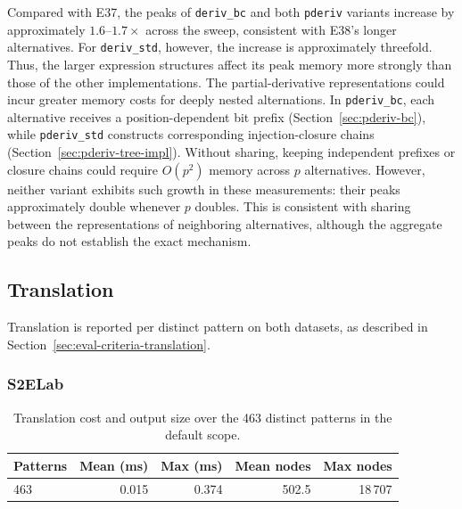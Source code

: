 Compared with E37, the peaks of
\texttt{deriv\_bc} and both \texttt{pderiv}
variants increase by approximately
$1.6$--$1.7\times$ across the sweep,
consistent with E38's longer alternatives.
For \texttt{deriv\_std}, however,
the increase is approximately threefold.
Thus, the larger expression structures
affect its peak memory more strongly
than those of the other implementations.
The partial-derivative representations
could incur greater memory costs for
deeply nested alternations.
In \texttt{pderiv\_bc}, each alternative
receives a position-dependent bit prefix
(Section~\ref{sec:pderiv-bc}), while
\texttt{pderiv\_std} constructs corresponding
injection-closure chains
(Section~\ref{sec:pderiv-tree-impl}).
Without sharing, keeping independent
prefixes or closure chains could require
$O(p^2)$ memory across $p$ alternatives.
However, neither variant exhibits such
growth in these measurements:
their peaks approximately double
whenever $p$ doubles.
This is consistent with sharing between
the representations of neighboring
alternatives, although the aggregate peaks
do not establish the exact mechanism.

%
%
%

\clearpage
\subsection{Translation}
\label{sec:eval-translate}

Translation is reported per distinct pattern on both datasets, 
as described in Section~\ref{sec:eval-criteria-translation}. 

%
%
%

\subsubsection{S2ELab}
\label{sec:eval-translate-s2elab}

\begin{table}[H]
\centering
\small
\setlength{\tabcolsep}{4pt}
\begin{tabular*}{\textwidth}{@{\extracolsep{\fill}} lrrrr}
\hline
Patterns & Mean (ms) & Max (ms) & Mean nodes & Max nodes \\
\hline
463 & 0.015 & 0.374 & 502.5 & 18\,707 \\
\hline
\end{tabular*}
\caption{Translation cost and output size over the 463 distinct patterns in
the default scope.}
\label{tab:translate-cost}
\end{table}

